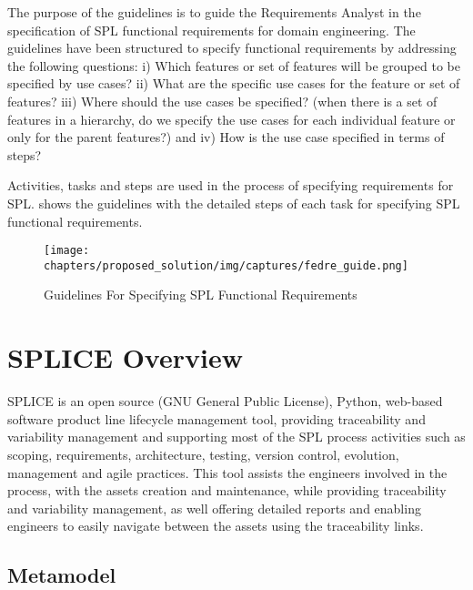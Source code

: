 The purpose of the guidelines is to guide the Requirements Analyst in 
the specification of \ac{SPL} functional requirements for domain engineering. The 
guidelines have been structured to specify functional requirements by addressing the following 
questions: i) Which features or set of features will be grouped to be specified by use 
cases? ii) What are the specific use cases for the feature or set of features? iii) Where 
should the use cases be specified? (when there is a set of features in a hierarchy, do we specify 
the use cases for each individual feature or only for the parent features?) and iv) How is the use 
case specified in terms of steps?

Activities, tasks and steps are used in the process of specifying requirements
for \ac{SPL}.  shows the guidelines with the detailed
steps of each task for specifying \ac{SPL} functional requirements.

\begin{figure}[htp]
\begin{center}
  \texttt{[image: chapters/proposed\_solution/img/captures/fedre\_guide.png]}
  \caption[Guidelines For Specifying SPL Functional Requirements]{Guidelines For Specifying SPL Functional Requirements \citep{de2014defining}}
  \label{fg:fedre-guide}
\end{center}
\end{figure}

\section{SPLICE Overview}
\label{sc:splice}

\acf{SPLICE} \citep{splice2014cbsof}  is an open source (GNU General Public
License), Python,  web-based software product line lifecycle management tool, providing 
traceability and variability management and supporting most of the \ac{SPL} process 
activities such as scoping, requirements, architecture, testing, version control, 
evolution, management and agile practices. This tool assists the engineers involved 
in the process, with the assets creation and maintenance, while providing traceability 
and variability management, as well offering detailed reports and enabling engineers 
to easily navigate between the assets using the traceability links.

\subsection{Metamodel}

